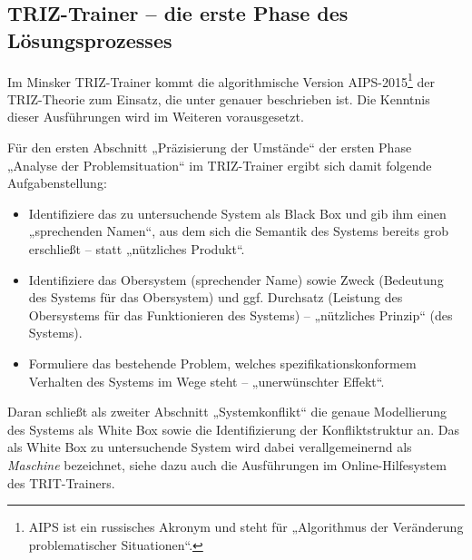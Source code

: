 \documentclass[11pt,a4paper]{article}
\begin{document}
\subsection*{TRIZ-Trainer -- die erste Phase des Lösungsprozesses}

Im Minsker TRIZ-Trainer kommt die algorithmische Version
AIPS-2015\footnote{AIPS ist ein russisches Akronym und steht für „Algorithmus
  der Veränderung problematischer Situationen“.} der TRIZ-Theorie zum Einsatz,
die unter \cite{TRIZTrainer.Problemloesungsprozess} genauer beschrieben ist.
Die Kenntnis dieser Ausführungen wird im Weiteren vorausgesetzt.

Für den ersten Abschnitt „Präzisierung der Umstände“ der ersten Phase „Analyse
der Problemsituation“ im TRIZ-Trainer ergibt sich damit folgende
Aufgabenstellung:
\begin{itemize}
\item [1.] Identifiziere das zu untersuchende System als Black Box und gib ihm
  einen „sprechenden Namen“, aus dem sich die Semantik des Systems bereits
  grob erschließt -- statt „nützliches Produkt“. 
\item [2.] Identifiziere das Obersystem (sprechender Name) sowie Zweck
  (Bedeutung des Systems für das Obersystem) und ggf. Durchsatz (Leistung des
  Obersystems für das Funktionieren des Systems) -- „nützliches Prinzip“ (des
  Systems). 
\item [3.] Formuliere das bestehende Problem, welches spezifikationskonformem
  Verhalten des Systems im Wege steht -- „unerwünschter Effekt“.
\end{itemize}
Daran schließt als zweiter Abschnitt „Systemkonflikt“ die genaue Modellierung
des Systems als White Box sowie die Identifizierung der Konfliktstruktur an.
Das als White Box zu untersuchende System wird dabei verallgemeinernd als
\emph{Maschine} bezeichnet, siehe dazu auch die Ausführungen im
Online-Hilfesystem des TRIT-Trainers.
\end{document}
